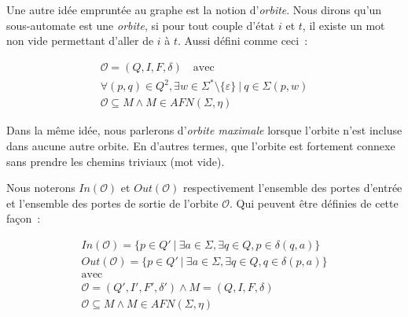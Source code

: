 \begin{definition}
    Une autre idée empruntée au graphe est la notion d'\textit{orbite}. Nous
    dirons qu'un sous-automate est une \textit{orbite}, si pour tout couple
    d'état \(i\) et \(t\), il existe un mot non vide permettant d'aller de
    \(i\) à \(t\). Aussi défini comme ceci~:

    \begin{gather*}
        \mathcal{O} = (Q, I, F, \delta) \quad \text{avec} \\
        \forall (p, q) \in Q^2, \exists w \in \Sigma^* \setminus \{\varepsilon\} ~|~ q \in \Sigma(p, w) \\
        \mathcal{O} \subseteq M \land M \in AFN(\Sigma, \eta)
    \end{gather*}

    \noindent Dans la même idée, nous parlerons d'\textit{orbite maximale}
    lorsque l'orbite n'est incluse dans aucune autre orbite. En d'autres
    termes, que l'orbite est fortement connexe sans prendre les chemins
    triviaux
    (mot vide).
\end{definition}

\begin{definition}
    Nous noterons \(In(\mathcal{O})\) et \(Out(\mathcal{O})\) respectivement
    l'ensemble des portes d'entrée et l'ensemble des portes de sortie de
    l'orbite \(\mathcal{O}\). Qui peuvent être définies de cette façon~:

    \begin{gather*}
        In(\mathcal{O}) = \{p \in Q' ~|~ \exists a \in \Sigma, \exists q \in Q,
        p \in \delta(q, a)\} \\
        Out(\mathcal{O}) = \{p \in Q' ~|~ \exists a \in \Sigma, \exists q \in
        Q, q \in \delta(p, a)\} \\
        \text{avec} \\
        \mathcal{O} = (Q', I', F', \delta') \land M = (Q, I, F, \delta) \\
        \mathcal{O} \subseteq M \land M \in AFN(\Sigma, \eta)
    \end{gather*}
\end{definition}

